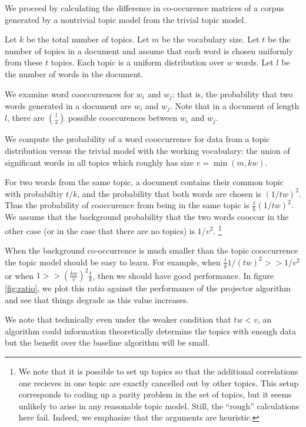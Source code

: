 We proceed by calculating the difference in co-occurence matrices of a
corpus generated by a nontrivial topic model from the trivial topic
model.

Let $k$ be the total number of topics. Let $m$ be the vocabulary size. Let
$t$ be the number of topics in a document and assume that 
each word is chosen uniformly from these $t$ topics. Each topic is a
uniform distribution over $w$ words. 
Let $l$ be the number of words in the document.

We examine word cooccurrences for $w_i$ and $w_j$: that is, the
probability that two words generated in a document are $w_i$ and
$w_j$.  Note that in a document of length $l$, there are ${l \choose
2}$ possible cooccurences between $w_i$ and $w_j$.

We compute the probability of a word cooccurrence for data from a
topic distribution versus  the trivial model with the working
vocabulary: the union of significant words in all topics which roughly has
size $v = \min(m,kw)$.

For two words from the same topic, a document contains their common
topic with probabiltiy $t/k$, and the probability that both words are
chosen is $(1/tw)^2$. Thus the probability of cooccurence from being
in the same topic is $\frac{t}{k} (1/tw)^2$.  We assume that the background
probability that the two words cooccur in the other case (or in the
case that there are no topics) is $1/v^2$.  \footnote{We note that it
is possible to set up topics so that the additional correlations one
recieves in one topic are exactly cancelled out by other topics.  This
setup corresponds to coding up a parity problem in the set of topics,
but it seems unlikely to arise in any reasonable topic model.  Still,
the ``rough'' calculations here fail. Indeed, we emphasize that the
arguments are heuristic.}

When the background co-occurrence is much smaller than the
topic cooccurrence the topic model should be easy to learn.  For
example, when $\frac{t}{k}{1/(tw)^2} >> 1/v^2$ or when $1 >>
(\frac{kw}{v})^2 \frac{t}{k}$, then we should have good
performance. In figure \ref{fig:ratio}, we plot this ratio against the
performance of the projector algorithm and see that things degrade as
this value increases.


We note that technically even under the weaker condition that $tw <
v$, an algorithm could information theoretically determine the topics
with enough data but the benefit over the baseline algorithm will be
small. 


